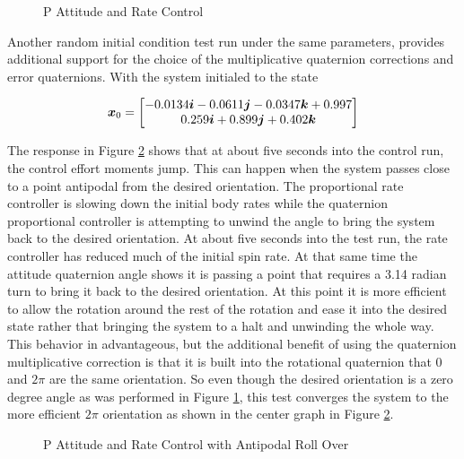 \begin{figure}[H]
  \centerline{}
  \caption{P Attitude and Rate Control}
  \label{fig:PAttitudeRateControl}
\end{figure}

Another random initial condition test run under the same parameters, provides additional support for the choice of the multiplicative quaternion corrections and error quaternions.  With the system initialed to the state

\begin{equation}
  \boldsymbol{x}_0 = \begin{bmatrix} -0.0134 \boldsymbol{i} -0.0611 \boldsymbol{j} -0.0347 \boldsymbol{k} +0.997 \\ 0.259 \boldsymbol{i} +0.899 \boldsymbol{j} +0.402 \boldsymbol{k} \end{bmatrix}
\end{equation}

The response in Figure \ref{fig:PAttitudeRateControlWithAntipodalRollOver} shows that at about five seconds into the control run, the control effort moments jump.  This can happen when the system passes close to a point antipodal from the desired orientation.  The proportional rate controller is slowing down the initial body rates while the quaternion proportional controller is attempting to unwind the angle to bring the system back to the desired orientation.  At about five seconds into the test run, the rate controller has reduced much of the initial spin rate.  At that same time the attitude quaternion angle shows it is passing a point that requires a 3.14 radian turn to bring it back to the desired orientation.  At this point it is more efficient to allow the rotation around the rest of the rotation and ease it into the desired state rather that bringing the system to a halt and unwinding the whole way.  This behavior in advantageous, but the additional benefit of using the quaternion multiplicative correction is that it is built into the rotational quaternion that 0 and $2\pi$ are the same orientation.  So even though the desired orientation is a zero degree angle as was performed in Figure \ref{fig:PAttitudeRateControl}, this test converges the system to the more efficient $2\pi$ orientation as shown in the center graph in Figure \ref{fig:PAttitudeRateControlWithAntipodalRollOver}.

\begin{figure}[H]
  \centerline{}
  \caption{P Attitude and Rate Control with Antipodal Roll Over}
  \label{fig:PAttitudeRateControlWithAntipodalRollOver}
\end{figure}


